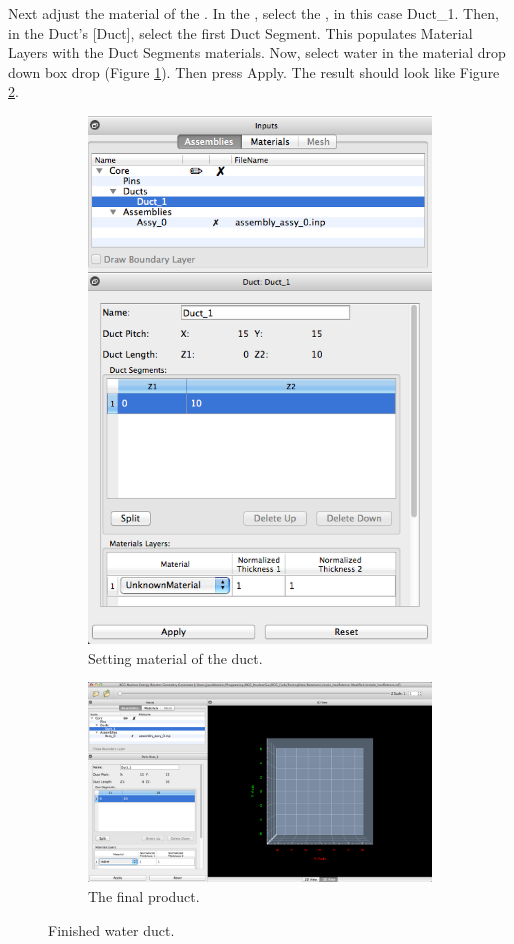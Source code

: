 Next adjust the material of the .  In the , select the , in this case Duct\_1.  Then, in the Duct's [Duct], select the first Duct Segment.  This populates Material Layers with the Duct Segments materials.  Now, select water in the material drop down box drop (Figure \ref{fig:rectSetMaterial}).  Then press Apply.  The result should look like Figure \ref{fig:rectDuctResult}.

\begin{figure}[hb]
\centering
\begin{subfigure}{.4\textwidth}
  \centering
  \includegraphics[width=0.5\linewidth]{Images/rect-set-material.png}
  \caption{Setting material of the duct.}
  \label{fig:rectSetMaterial}
\end{subfigure}%
\begin{subfigure}{.6\textwidth}
  \centering
  \includegraphics[width=0.9\linewidth]{Images/rect-duct-result.png}
  \caption{The final product.}
  \label{fig:rectDuctResult}
\end{subfigure}
\caption{Finished water duct.}
\label{fig:test}
\end{figure}


